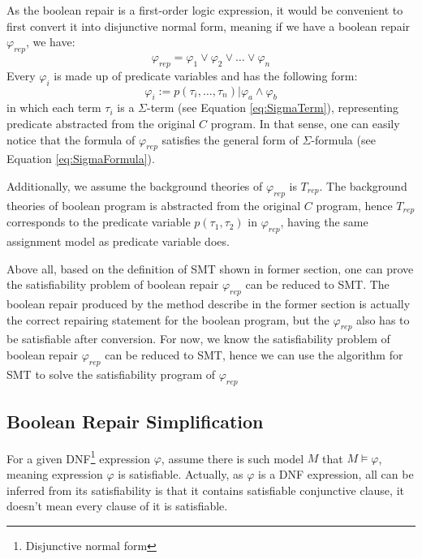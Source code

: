 As the boolean repair is a first-order logic expression, it would be convenient to first convert it into disjunctive normal form, meaning if we have a boolean repair $\varphi _{rep}$, we have:
\begin{equation}
\varphi _{rep} = \varphi _{1} \vee \varphi _{2} \vee \dots \vee \varphi _{n}
\end{equation}
Every $\varphi _{i}$ is made up of predicate variables and has the following form:
\begin{equation}
\varphi _{i} := p(\tau _{i},\dots,\tau _{n}) | \varphi _{a} \wedge \varphi _{b}
\end{equation}
in which each term $\tau _{i}$ is a $\Sigma$-term (see Equation \ref{eq:SigmaTerm}), representing predicate abstracted from the original $C$ program.
In that sense, one can easily notice that the formula of $\varphi _{rep}$ satisfies the general form of $\Sigma$-formula (see Equation \ref{eq:SigmaFormula}).

Additionally, we assume the background theories of $\varphi _{rep}$ is $T_{rep}$.
The background theories of boolean program is abstracted from the original $C$ program, hence $T_{rep}$ corresponds to the predicate variable $p(\tau _{1}, \tau _{2})$ in $\varphi _{rep}$, having the same assignment model as predicate variable does.

Above all, based on the definition of SMT shown in former section, one can prove the satisfiability problem of boolean repair $\varphi _{rep}$ can be reduced to SMT.
The boolean repair produced by the method describe in the former section is actually the correct repairing statement for the boolean program, but the $\varphi _{rep}$ also has to be satisfiable after conversion.
For now, we know the satisfiability problem of boolean repair $\varphi _{rep}$ can be reduced to SMT, hence we can use the algorithm for SMT to solve the satisfiability program of $\varphi _{rep}$

\subsection{Boolean Repair Simplification}
\label{section:BooleanRepairSimplification}
For a given DNF\footnote{Disjunctive normal form} expression $\varphi$, assume there is such model $M$ that $M \models \varphi$, meaning expression $\varphi$ is satisfiable.
Actually, as $\varphi$ is a DNF expression, all can be inferred from its satisfiability is that it contains satisfiable conjunctive clause, it doesn't mean every clause of it is satisfiable.


